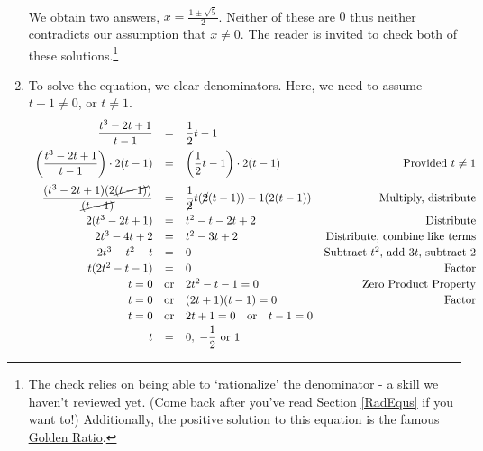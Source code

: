 \documentclass[10pt]{article}
\begin{document}
\begin{ex}
\begin{enumerate}
\[\begin{array}{rclr}
\end{array}\]

We obtain two answers, $x = \frac{1 \pm \sqrt{5}}{2}$.  Neither of these are $0$ thus neither contradicts our assumption that $x \neq 0$.  The reader is invited to check both of these solutions.\footnote{The check relies on being able to `rationalize' the denominator  - a skill we haven't reviewed yet. (Come back after you've read Section \ref{RadEqus} if you want to!)  Additionally, the positive solution to this equation is the famous \href{http://en.wikipedia.org/wiki/Golden_ratio}{\underline{Golden Ratio}}.}

\item  To solve the equation, we clear denominators.  Here, we need to assume $t-1 \neq 0$, or $t \neq 1$.\[ \begin{array}{rclr}

\dfrac{t^3-2t+1}{t-1} & = & \dfrac{1}{2}t-1 & \\ [8pt]

\left(\dfrac{t^3-2t+1}{t-1}\right) \cdot 2(t-1) & = & \left( \dfrac{1}{2}t-1 \right) \cdot 2(t-1) & \text{Provided $t \neq 1$} \\ [12pt]

\dfrac{(t^3-2t+1)(2\cancel{(t-1)})}{\cancel{(t-1)}}  & = & \dfrac{1}{\cancel{2}} t (\cancel{2}(t-1)) - 1(2(t-1))  & \text{Multiply, distribute} \\ [8pt]

2(t^3-2t+1) & = & t^2 - t - 2t + 2 & \text{Distribute} \\ [2pt]

2t^3 - 4t + 2 & = & t^2 -3t + 2 & \text{Distribute, combine like terms} \\ [2pt]

2t^3 -t^2 - t & = & 0 & \text{Subtract $t^2$, add $3t$, subtract $2$}\\ [2pt]

t(2t^2 -t - 1) & = & 0 & \text{Factor} \\ [2pt]

t = 0 & \text{or} & 2t^2 - t - 1 = 0 & \text{Zero Product Property}\\ [2pt]

t = 0 & \text{or} & (2t+1)(t-1) = 0 & \text{Factor}\\ [2pt]

t = 0 & \text{or} & 2t+1 = 0 \quad \text{or} \quad t-1 = 0 &\\ [2pt]

t & = & 0, \; -\dfrac{1}{2} \text{ or } 1 & \\


\end{array}\]
\end{enumerate}
\end{ex}
\end{document}
